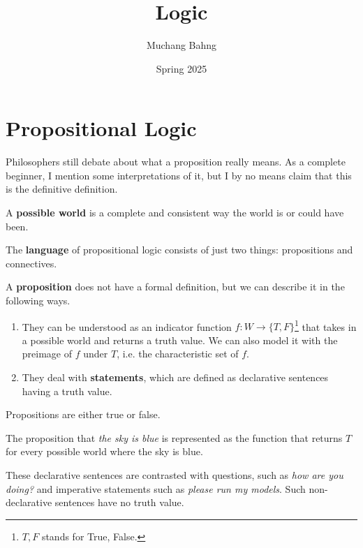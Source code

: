 \documentclass{article}
\begin{document}
\title{Logic}
\author{Muchang Bahng}
\date{Spring 2025}

\maketitle
\tableofcontents
\pagebreak

\section{Propositional Logic} 

    Philosophers still debate about what a proposition really means. As a complete beginner, I mention some interpretations of it, but I by no means claim that this is the definitive definition. 

    \begin{definition}
      A \textbf{possible world} is a complete and consistent way the world is or could have been. 
    \end{definition} 

    The \textbf{language} of propositional logic consists of just two things: propositions and connectives. 

    \begin{definition}[Proposition]
      A \textbf{proposition} does not have a formal definition, but we can describe it in the following ways.  
      \begin{enumerate}
        \item They can be understood as an indicator function $f: W \rightarrow \{T, F\}$\footnote{$T, F$ stands for True, False.} that takes in a possible world and returns a truth value. We can also model it with the preimage of $f$ under $T$, i.e. the characteristic set of $f$. 
        \item They deal with \textbf{statements}, which are defined as declarative sentences having a truth value. 
      \end{enumerate} 
      Propositions are either true or false. 
    \end{definition}

    \begin{example}
      The proposition that \textit{the sky is blue} is represented as the function that returns $T$ for every possible world where the sky is blue. 
    \end{example}

    These declarative sentences are contrasted with questions, such as \textit{how are you doing?} and imperative statements such as \textit{please run my models}. Such non-declarative sentences have no truth value. 
\end{document}
